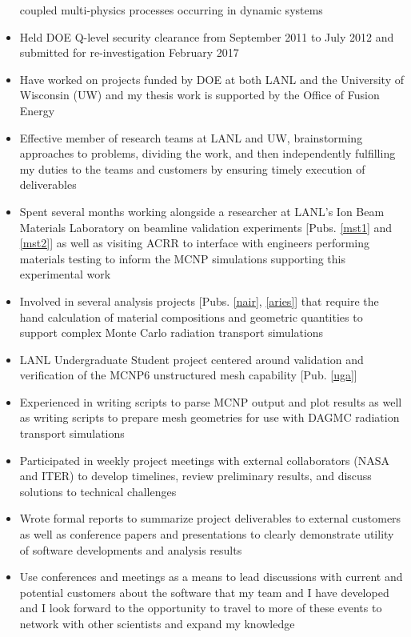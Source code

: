 \begin{center}
\begin{minipage}{\textwidth}
\begin{itemize}[leftmargin=.875in,rightmargin=.875in,itemsep=1.0mm]
		       coupled multi-physics processes occurring in dynamic
		       systems
              \item Held DOE Q-level security clearance from September 2011 to July
		      2012 and submitted for re-investigation February 2017
		\item  Have worked on projects funded by DOE at both LANL and
			the University of Wisconsin (UW) and my thesis work is supported by the Office of Fusion Energy
		\item Effective member of research teams at LANL and
			UW, brainstorming approaches to problems, dividing the
			work, and then independently fulfilling my duties to the teams and
			customers by ensuring timely execution of deliverables
		\item Spent several months working alongside a researcher
			at LANL's Ion Beam Materials Laboratory
			on beamline validation experiments 
		        [Pubs. \ref{mst1} and \ref{mst2}]
                        as well as
			visiting ACRR to interface with engineers performing
			materials testing to inform the MCNP simulations
			supporting this experimental work
	       \item Involved in several analysis projects
		      [Pubs. \ref{nair}, \ref{aries}]	       
			       that require the hand calculation of material compositions
			     and geometric quantities to support complex Monte
			      Carlo radiation transport simulations
	       \item  LANL Undergraduate Student project centered around validation and
		       verification of the MCNP6 unstructured mesh
		       capability [Pub. \ref{uga}]
	       \item Experienced in writing scripts to parse MCNP output
	               and plot results as well as writing scripts to
		       prepare mesh geometries for use with DAGMC
		       radiation transport simulations
                \item Participated in weekly project meetings with external collaborators (NASA and
	              ITER) to develop timelines, review preliminary results, and discuss
		      solutions to technical challenges
		\item Wrote formal reports to summarize project
			deliverables to external customers as well as conference
			papers and presentations to clearly demonstrate
			utility of software
			developments and analysis results
	       \item Use conferences and meetings as a means to lead
		       discussions with current and potential customers about
		       the software that my team and I have developed and I look forward to the opportunity to travel to
		       more of these events to network with other
			scientists and expand my knowledge
		       



\end{itemize}
\end{minipage}
\end{center}
